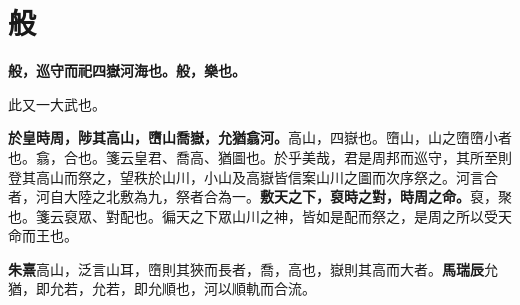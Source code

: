 \section{般}


\textbf{般，巡守而祀四嶽河海也。般，樂也。}

\begin{quoting}此又一大武也。\end{quoting}

\textbf{於皇時周，陟其高山，嶞山喬嶽，允猶翕河。}{\footnotesize 高山，四嶽也。嶞山，山之嶞嶞小者也。翕，合也。箋云皇君、喬高、猶圖也。於乎美哉，君是周邦而巡守，其所至則登其高山而祭之，望秩於山川，小山及高嶽皆信案山川之圖而次序祭之。河言合者，河自大陸之北敷為九，祭者合為一。}\textbf{敷天之下，裒時之對，時周之命。}{\footnotesize 裒，聚也。箋云裒眾、對配也。徧天之下眾山川之神，皆如是配而祭之，是周之所以受天命而王也。}

\begin{quoting}\textbf{朱熹}高山，泛言山耳，嶞則其狹而長者，喬，高也，嶽則其高而大者。\textbf{馬瑞辰}允猶，即允若，允若，即允順也，河以順軌而合流。\end{quoting}

